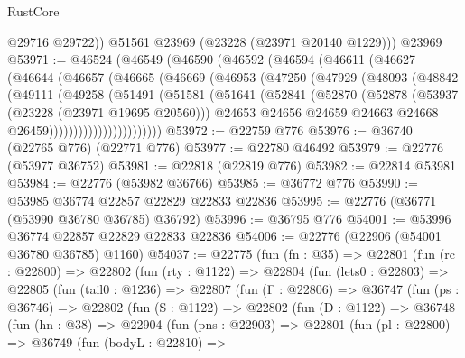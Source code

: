 \begin{lexlean}{RustCore}
\begin{coremodule}
          @29716
          @29722))
      @51561
      @23969
      (@23228 (@23971 @20140 @1229)))
    @23969
@53971 := @46524
    (@46549
      (@46590
        (@46592
          (@46594
            (@46611
              (@46627
                (@46644
                  (@46657
                    (@46665
                      (@46669
                        (@46953
                          (@47250
                            (@47929
                              (@48093
                                (@48842
                                  (@49111
                                    (@49258
                                      (@51491
                                        (@51581
                                          (@51641
                                            (@52841
                                              (@52870
                                                (@52878
                                                  (@53937 (@23228 (@23971 @19695 @20560)))
                                                  @24653
                                                  @24656
                                                  @24659
                                                  @24663
                                                  @24668
                                                  @26459)))))))))))))))))))))))
@53972 := @22759 @776
@53976 := @36740 (@22765 @776) (@22771 @776)
@53977 := @22780 @46492
@53979 := @22776 (@53977 @36752)
@53981 := @22818 (@22819 @776)
@53982 := @22814 @53981
@53984 := @22776 (@53982 @36766)
@53985 := @36772 @776
@53990 := @53985 @36774 @22857 @22829 @22833 @22836
@53995 := @22776 (@36771 (@53990 @36780 @36785) @36792)
@53996 := @36795 @776
@54001 := @53996 @36774 @22857 @22829 @22833 @22836
@54006 := @22776 (@22906 (@54001 @36780 @36785) @1160)
@54037 := @22775
    (fun (fn : @35) =>
    @22801
      (fun (rc : @22800) =>
      @22802
        (fun (rty : @1122) =>
        @22804
          (fun (lets0 : @22803) =>
          @22805
            (fun (tail0 : @1236) =>
            @22807
              (fun (Γ : @22806) =>
              @36747
                (fun (ps : @36746) =>
                @22802
                  (fun (S : @1122) =>
                  @22802
                    (fun (D : @1122) =>
                    @36748
                      (fun (hn : @38) =>
                      @22904
                        (fun (pns : @22903) =>
                        @22801
                          (fun (pl : @22800) =>
                          @36749
                            (fun (bodyL : @22810) =>

\end{coremodule}
\end{lexlean}
